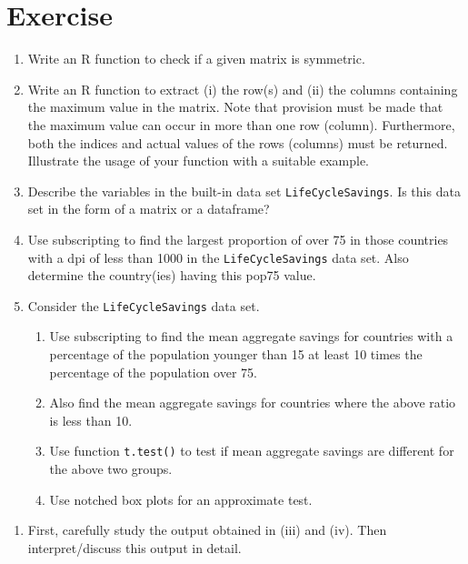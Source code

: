 \documentclass[
]{book}
\providecommand{\tightlist}{%
  \setlength{\itemsep}{0pt}\setlength{\parskip}{0pt}}
\begin{document}
\section{Exercise}\label{exercise-10}

\begin{enumerate}
\def\labelenumi{\arabic{enumi}.}
\item
  Write an R function to check if a given matrix is symmetric.
\item
  Write an R function to extract (i) the row(s) and (ii) the columns containing the maximum value in the matrix. Note that provision must be made that the maximum value can occur in more than one row (column). Furthermore, both the indices and actual values of the rows (columns) must be returned. Illustrate the usage of your function with a suitable example.
\item
  Describe the variables in the built-in data set \texttt{LifeCycleSavings}. Is this data set in the form of a matrix or a dataframe?
\item
  Use subscripting to find the largest proportion of over 75 in those countries with a dpi of less than 1000 in the \texttt{LifeCycleSavings} data set. Also determine the country(ies) having this pop75 value.
\item
  Consider the \texttt{LifeCycleSavings} data set.

  \begin{enumerate}
  \def\labelenumii{(\roman{enumii})}
  \tightlist
  \item
    Use subscripting to find the mean aggregate savings for countries with a percentage of the population younger than 15 at least 10 times the percentage of the population over 75.
  \item
    Also find the mean aggregate savings for countries where the above ratio is less than 10.
  \item
    Use function \texttt{t.test()} to test if mean aggregate savings are different for the above two groups.
  \item
    Use notched box plots for an approximate test.
  \end{enumerate}
\end{enumerate}

\begin{enumerate}
\def\labelenumi{(\alph{enumi})}
\setcounter{enumi}{21}
\tightlist
\item
  First, carefully study the output obtained in (iii) and (iv). Then interpret/discuss this output in detail.
\end{enumerate}
\end{document}
